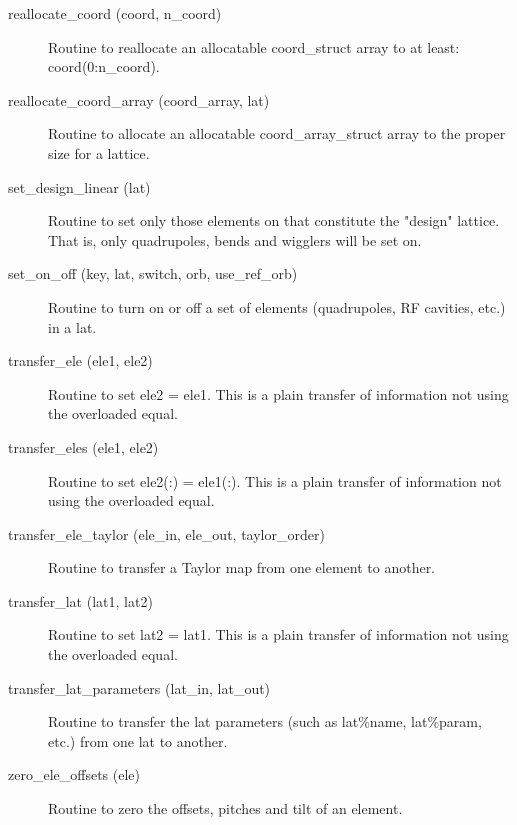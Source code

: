 \begin{description}
\label{r:reallocate.coord}
\item[reallocate_coord (coord, n_coord)] \Newline 
Routine to reallocate an allocatable  coord_struct array to at least:
coord(0:n_coord).

\label{r:reallocate.coord.array}
\item[reallocate_coord_array (coord_array, lat)] \Newline 
Routine to allocate an allocatable coord_array_struct array to
the proper size for a lattice.

\label{r:set.design.linear}
\item[set_design_linear (lat)] \Newline
Routine to set only those elements on that constitute the "design" 
lattice. That is, only quadrupoles, bends and wigglers will be set on. 

\label{r:set.on.off}
\item[set_on_off (key, lat, switch, orb, use_ref_orb)] \Newline
Routine to turn on or off a set of elements (quadrupoles,
RF cavities, etc.) in a lat.

\label{r:transfer.ele}
\item[transfer_ele (ele1, ele2)] \Newline 
     Routine to set ele2 = ele1. 
     This is a plain transfer of information not using the overloaded equal.

\label{r:transfer.eles}
\item[transfer_eles (ele1, ele2)] \Newline 
     Routine to set ele2(:) = ele1(:). 
     This is a plain transfer of information not using the overloaded equal.

\item[transfer_ele_taylor (ele_in, ele_out, taylor_order)] \Newline 
     Routine to transfer a Taylor map from one element to another.

\label{r:transfer.lat}
\item[transfer_lat (lat1, lat2)] \Newline 
     Routine to set lat2 = lat1. 
     This is a plain transfer of information not using the overloaded equal.

\label{r:transfer.lat.parameters}
\item[transfer_lat_parameters (lat_in, lat_out)] \Newline
Routine to transfer the lat parameters (such as lat\%name, 
lat\%param, etc.) from one lat to another. 


\label{r:zero.ele.offsets}
\item[zero_ele_offsets (ele)] \Newline 
Routine to zero the offsets, pitches and tilt of an element.

\end{description}


